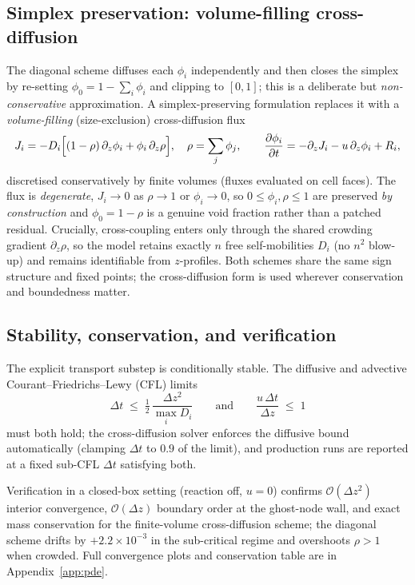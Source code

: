 \subsection{Simplex preservation: volume-filling cross-diffusion}
\label{sec:pde_xdiff}
The diagonal scheme diffuses each $\phi_i$ independently and then closes the simplex by
re-setting $\phi_0=1-\sum_i\phi_i$ and clipping to $[0,1]$; this is a deliberate but
\emph{non-conservative} approximation. A simplex-preserving formulation replaces it with a
\emph{volume-filling} (size-exclusion) cross-diffusion flux~\cite{PainterHillen2002VolumeFilling}
\begin{equation}
  J_i = -D_i\Bigl[(1-\rho)\,\partial_z\phi_i + \phi_i\,\partial_z\rho\Bigr],
  \quad \rho=\sum_{j}\phi_j,
  \qquad
  \frac{\partial\phi_i}{\partial t} = -\partial_z J_i - u\,\partial_z\phi_i + R_i,
  \label{eq:xdiff}
\end{equation}
discretised conservatively by finite volumes (fluxes evaluated on cell faces). The flux is
\emph{degenerate}, $J_i\to0$ as $\rho\to1$ or $\phi_i\to0$, so $0\le\phi_i,\rho\le1$ are
preserved \emph{by construction} and $\phi_0=1-\rho$ is a genuine void fraction rather than
a patched residual. Crucially, cross-coupling enters only through the shared crowding
gradient $\partial_z\rho$, so the model retains exactly $n$ free self-mobilities $D_i$
(no $n^2$ blow-up) and remains identifiable from $z$-profiles. Both schemes share the same
sign structure and fixed points; the cross-diffusion form is used wherever conservation and
boundedness matter.

\subsection{Stability, conservation, and verification}
\label{sec:pde_verification}
The explicit transport substep is conditionally stable. The diffusive and advective
Courant--Friedrichs--Lewy (CFL) limits
\begin{equation}
  \Delta t \;\le\; \tfrac12\,\frac{\Delta z^2}{\max_i D_i}
  \qquad\text{and}\qquad
  \frac{u\,\Delta t}{\Delta z} \;\le\; 1
  \label{eq:cfl}
\end{equation}
must both hold; the cross-diffusion solver enforces the diffusive bound automatically
(clamping $\Delta t$ to $0.9$ of the limit), and production runs are reported at a fixed
sub-CFL $\Delta t$ satisfying both.

Verification in a closed-box setting (reaction off, $u=0$) confirms $\mathcal{O}(\Delta z^2)$ interior convergence, $\mathcal{O}(\Delta z)$ boundary order at the ghost-node wall, and exact mass conservation for the finite-volume cross-diffusion scheme; the diagonal scheme drifts by $+2.2\times10^{-3}$ in the sub-critical regime and overshoots $\rho>1$ when crowded. Full convergence plots and conservation table are in Appendix~\ref{app:pde}.

